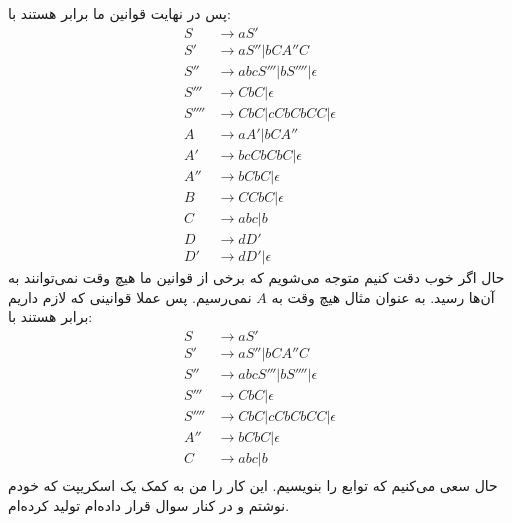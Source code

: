 \documentclass[]{article}
\begin{document}
پس در نهایت قوانین ما برابر هستند با:
\begin{align*}
    S &\rightarrow aS'\\
    S' &\rightarrow aS'' | bCA''C\\
    S'' &\rightarrow abcS''' | bS'''' | \epsilon\\
    S''' &\rightarrow CbC | \epsilon\\
    S'''' &\rightarrow CbC | cCbCbCC | \epsilon\\
    A  &\rightarrow aA' | bCA''\\
    A' &\rightarrow bcCbCbC | \epsilon\\
    A'' &\rightarrow bCbC | \epsilon\\
    B &\rightarrow CCbC | \epsilon\\
    C &\rightarrow abc | b\\
    D &\rightarrow dD'\\
    D' &\rightarrow dD' | \epsilon
\end{align*}
حال اگر خوب دقت کنیم متوجه می‌شویم که برخی از قوانین ما هیچ وقت نمی‌توانند به آن‌ها رسید.
به عنوان مثال هیچ وقت به
$A$
نمی‌رسیم. پس عملا قوانینی که لازم داریم برابر هستند با:
\begin{align*}
    S &\rightarrow aS'\\
    S' &\rightarrow aS'' | bCA''C\\
    S'' &\rightarrow abcS''' | bS'''' | \epsilon\\
    S''' &\rightarrow CbC | \epsilon\\
    S'''' &\rightarrow CbC | cCbCbCC | \epsilon\\
    A'' &\rightarrow bCbC | \epsilon\\
    C &\rightarrow abc | b\\
\end{align*}
حال سعی می‌کنیم که توابع را بنویسیم. این کار را من به کمک یک اسکریپت که خودم نوشتم و در کنار سوال
قرار داده‌ام تولید کرده‌ام.
\end{document}
